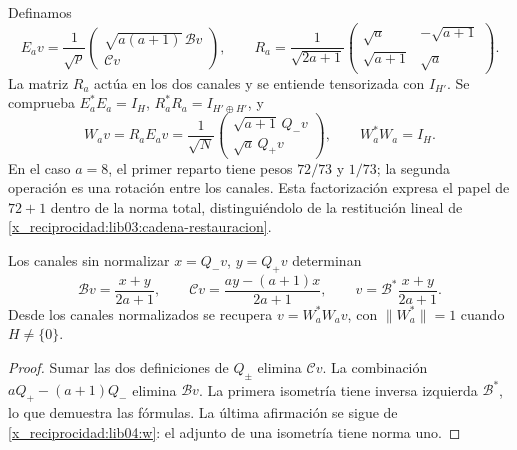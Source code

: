 Definamos
\begin{equation}
 E_av=\frac1{\sqrt p}
 \begin{pmatrix}\sqrt{a(a+1)}\,\mathcal Bv\\\mathcal Cv\end{pmatrix},
 \qquad
 R_a=\frac1{\sqrt{2a+1}}
 \begin{pmatrix}\sqrt a&-\sqrt{a+1}\\
                 \sqrt{a+1}&\sqrt a\end{pmatrix}.
 \label{x_reciprocidad:lib04:factorizacion-er}
\end{equation}
La matriz \(R_a\) actúa en los dos canales y se entiende tensorizada
con \(I_{H'}\). Se comprueba
\(E_a^*E_a=I_H\), \(R_a^*R_a=I_{H'\oplus H'}\), y
\begin{equation}
 W_av=R_aE_av
 =\frac1{\sqrt N}
 \begin{pmatrix}\sqrt{a+1}\,Q_-v\\\sqrt a\,Q_+v\end{pmatrix},
 \qquad W_a^*W_a=I_H.
 \label{x_reciprocidad:lib04:w}
\end{equation}
En el caso \(a=8\), el primer reparto tiene pesos \(72/73\) y
\(1/73\); la segunda operación es una rotación entre los canales.
Esta factorización expresa el papel de \(72+1\) dentro de la norma
total, distinguiéndolo de la restitución lineal de
\eqref{x_reciprocidad:lib03:cadena-restauracion}.

\begin{proposition}
\label{x_reciprocidad:lib04:prop-recuperacion}
Los canales sin normalizar \(x=Q_-v\), \(y=Q_+v\) determinan
\begin{equation}
 \mathcal Bv=\frac{x+y}{2a+1},\qquad
 \mathcal Cv=\frac{ay-(a+1)x}{2a+1},\qquad
 v=\mathcal B^*\frac{x+y}{2a+1}.
 \label{x_reciprocidad:lib04:inversa-canales}
\end{equation}
Desde los canales normalizados se recupera
\(v=W_a^*W_av\), con \(\|W_a^*\|=1\) cuando \(H\neq\{0\}\).
\end{proposition}

\begin{proof}
Sumar las dos definiciones de \(Q_\pm\) elimina \(\mathcal Cv\).
La combinación \(aQ_+-(a+1)Q_-\) elimina \(\mathcal Bv\).
La primera isometría tiene inversa izquierda \(\mathcal B^*\), lo
que demuestra las fórmulas. La última afirmación se sigue de
\eqref{x_reciprocidad:lib04:w}: el adjunto de una isometría tiene norma uno.
\end{proof}

